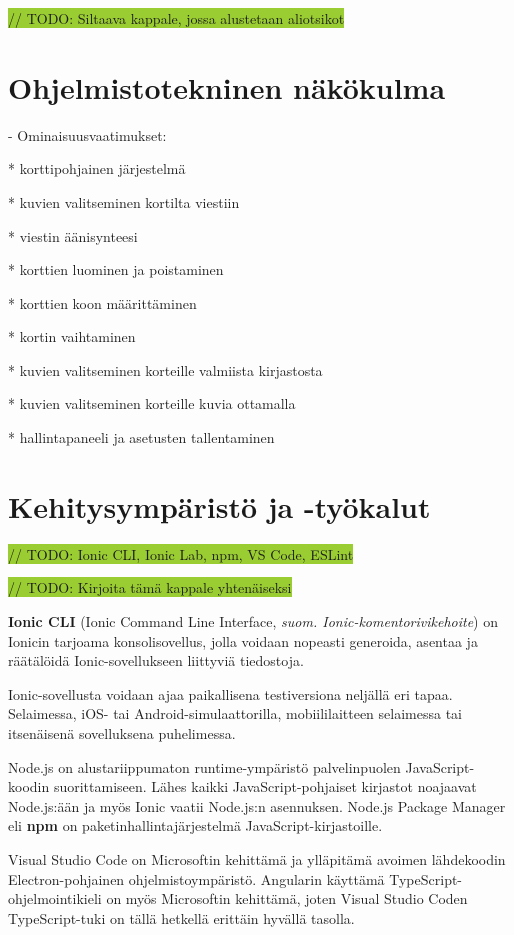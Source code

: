 \documentclass[utf8]{gradu3}
\begin{document}
\colorbox{YellowGreen}{// TODO: Siltaava kappale, jossa alustetaan aliotsikot}

\section{Ohjelmistotekninen näkökulma}

- Ominaisuusvaatimukset:

  * korttipohjainen järjestelmä
  
  * kuvien valitseminen kortilta viestiin
  
  * viestin äänisynteesi
  
  * korttien luominen ja poistaminen
  
  * korttien koon määrittäminen
  
  * kortin vaihtaminen
  
  * kuvien valitseminen korteille valmiista kirjastosta
  
  * kuvien valitseminen korteille kuvia ottamalla
  
  * hallintapaneeli ja asetusten tallentaminen


\section{Kehitysympäristö ja -työkalut}

\colorbox{YellowGreen}{// TODO: Ionic CLI, Ionic Lab, npm, VS Code, ESLint}

\colorbox{YellowGreen}{// TODO: Kirjoita tämä kappale yhtenäiseksi}

\textbf{Ionic CLI} (Ionic Command Line Interface, \textit{suom. Ionic-komentorivikehoite}) on Ionicin tarjoama konsolisovellus, jolla voidaan nopeasti generoida, asentaa ja räätälöidä Ionic-sovellukseen liittyviä tiedostoja.

Ionic-sovellusta voidaan ajaa paikallisena testiversiona neljällä eri tapaa. Selaimessa, iOS- tai Android-simulaattorilla, mobiililaitteen selaimessa tai itsenäisenä sovelluksena puhelimessa.

Node.js on alustariippumaton runtime-ympäristö palvelinpuolen JavaScript-koodin suorittamiseen. Lähes kaikki JavaScript-pohjaiset kirjastot noajaavat Node.js:ään ja myös Ionic vaatii Node.js:n asennuksen. Node.js Package Manager eli \textbf{npm} on paketinhallintajärjestelmä JavaScript-kirjastoille.

Visual Studio Code on Microsoftin kehittämä ja ylläpitämä avoimen lähdekoodin Electron-pohjainen ohjelmistoympäristö. Angularin käyttämä TypeScript-ohjelmointikieli on myös Microsoftin kehittämä, joten Visual Studio Coden TypeScript-tuki on tällä hetkellä erittäin hyvällä tasolla.
\end{document}
